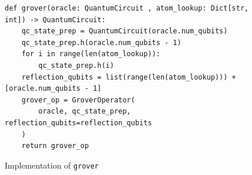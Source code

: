 \begin{figure}
\centering
\begin{verbatim}
def grover(oracle: QuantumCircuit , atom_lookup: Dict[str, int]) -> QuantumCircuit:
    qc_state_prep = QuantumCircuit(oracle.num_qubits)
    qc_state_prep.h(oracle.num_qubits - 1)
    for i in range(len(atom_lookup)):
        qc_state_prep.h(i)
    reflection_qubits = list(range(len(atom_lookup))) + [oracle.num_qubits - 1]
    grover_op = GroverOperator(
        oracle, qc_state_prep, reflection_qubits=reflection_qubits
    )
    return grover_op
\end{verbatim}
\caption{Implementation of \texttt{grover} }
\label{fig:grover}
\end{figure}


